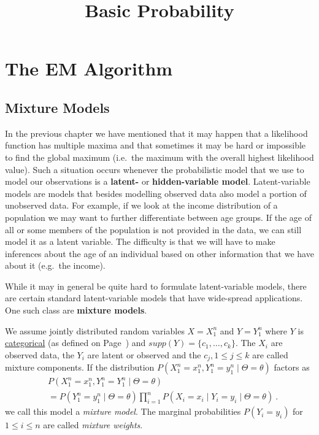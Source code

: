 \documentclass[a4paper,11pt,leqno]{report}\usepackage[]{graphicx}\usepackage[]{color}
\title{Basic Probability}
\date{}
\begin{document}
\setcounter{chapter}{5}



\chapter{The EM Algorithm}

\section{Mixture Models}\label{sec:mixtureModels}

In the previous chapter we have mentioned that it may happen that a likelihood function has multiple 
maxima and that sometimes it may be hard or impossible to find the global maximum (i.e.\ the maximum
with the overall highest likelihood value). Such a situation occurs whenever the probabilistic model
that we use to model our observations is a \textbf{latent-} or \textbf{hidden-variable model}. Latent-variable
models are models that besides modelling observed data also model a portion of unobserved data. For
example, if we look at the income distribution of a population we may want to further differentiate
between age groups. If the age of all or some members of the population is not provided in the data, we
can still model it as a latent variable. The difficulty is that we will have to make inferences about the
age of an individual based on other information that we have about it (e.g.\ the income). 

While it may in general be quite hard to formulate latent-variable models, there are certain standard
latent-variable models that have wide-spread applications. One such class are \textbf{mixture models}.

\begin{Definition}\label{def:mixtureModel}
We assume jointly distributed random variables $ X=X_{1}^{n} $ and $
Y=Y_{1}^{n} $ where $ Y $ is \href{https://en.wikipedia.org/wiki/Categorical_variable}{categorical} (as defined on Page~\pageref{lab:categorical}) and
$ supp(Y) = \{c_{1}, \ldots, c_{k}\} $. The $ X_{i} $ are observed data, the $ Y_{i} $ are latent
or observed and the $ c_{j}, 1\leq j \leq k $ are called mixture components. 
If the distribution
$ P(X_{1}^{n}=x_{1}^{n}, Y_{1}^{n} = y_{1}^{n}\mid \Theta = \theta) $ factors as
\begin{align*}
&P(X_{1}^{n}=x_{1}^{n}, Y_{1}^{n} = Y_{1}^{n}\mid \Theta = \theta)  \\
&= P(Y_{1}^{n} = y_{1}^{n}\mid \Theta = \theta) \prod_{i=1}^{n} 
P(X_{i}=x_{i} \mid Y_{i} = y_{i}\mid \Theta = \theta) \ .
\end{align*}
we call this model a \emph{mixture model}. The marginal probabilities $ P(Y_{i}=y_{i}) $ for $ 1 \leq i \leq n $ are called
\emph{mixture weights}.
\end{Definition}
\end{document}
